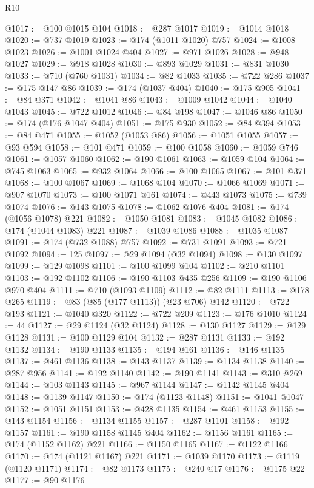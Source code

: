 \begin{lexlean}{R10}
\begin{coremodule}
@1017 := @100 @1015 @104
@1018 := @287 @1017
@1019 := @1014 @1018
@1020 := @737 @1019
@1023 := @174 (@1011 @1020) @757
@1024 := @1008 @1023
@1026 := @1001 @1024 @404
@1027 := @971 @1026
@1028 := @948 @1027
@1029 := @918 @1028
@1030 := @893 @1029
@1031 := @831 @1030
@1033 := @710 (@760 @1031)
@1034 := @82 @1033
@1035 := @722 @286
@1037 := @175 @147 @86
@1039 := @174 (@1037 @404)
@1040 := @175 @905
@1041 := @84 @371
@1042 := @1041 @86
@1043 := @1009 @1042
@1044 := @1040 @1043
@1045 := @722 @1012
@1046 := @84 @198
@1047 := @1046 @86
@1050 := @174 (@176 @1047 @404)
@1051 := @175 @930
@1052 := @84 @394
@1053 := @84 @471
@1055 := @1052 (@1053 @86)
@1056 := @1051 @1055
@1057 := @93 @594
@1058 := @101 @471
@1059 := @100 @1058
@1060 := @1059 @746
@1061 := @1057 @1060
@1062 := @190 @1061
@1063 := @1059 @104
@1064 := @745 @1063
@1065 := @932 @1064
@1066 := @100 @1065
@1067 := @101 @371
@1068 := @100 @1067
@1069 := @1068 @104
@1070 := @1066 @1069
@1071 := @907 @1070
@1073 := @100 @1071 @161
@1074 := @443 @1073
@1075 := @739 @1074
@1076 := @143 @1075
@1078 := @1062 @1076 @404
@1081 := @174 (@1056 @1078) @221
@1082 := @1050 @1081
@1083 := @1045 @1082
@1086 := @174 (@1044 @1083) @221
@1087 := @1039 @1086
@1088 := @1035 @1087
@1091 := @174 (@732 @1088) @757
@1092 := @731 @1091
@1093 := @721 @1092
@1094 := 125
@1097 := @29 @1094 (@32 @1094)
@1098 := @130 @1097
@1099 := @129 @1098
@1101 := @100 @1099 @104
@1102 := @210 @1101
@1103 := @192 @1102
@1106 := @190 @1103 @435 @256
@1109 := @190 @1106 @970 @404
@1111 := @710 (@1093 @1109)
@1112 := @82 @1111
@1113 := @178 @265
@1119 := @83 (@85 (@177 @1113)) (@23 @706) @142
@1120 := @722 @193
@1121 := @1040 @320
@1122 := @722 @209
@1123 := @176 @1010
@1124 := 44
@1127 := @29 @1124 (@32 @1124)
@1128 := @130 @1127
@1129 := @129 @1128
@1131 := @100 @1129 @104
@1132 := @287 @1131
@1133 := @192 @1132
@1134 := @190 @1133
@1135 := @194 @161
@1136 := @146 @1135
@1137 := @461 @1136
@1138 := @143 @1137
@1139 := @1134 @1138
@1140 := @287 @956
@1141 := @192 @1140
@1142 := @190 @1141
@1143 := @310 @269
@1144 := @103 @1143
@1145 := @967 @1144
@1147 := @1142 @1145 @404
@1148 := @1139 @1147
@1150 := @174 (@1123 @1148)
@1151 := @1041 @1047
@1152 := @1051 @1151
@1153 := @428 @1135
@1154 := @461 @1153
@1155 := @143 @1154
@1156 := @1134 @1155
@1157 := @287 @1101
@1158 := @192 @1157
@1161 := @190 @1158 @1145 @404
@1162 := @1156 @1161
@1165 := @174 (@1152 @1162) @221
@1166 := @1150 @1165
@1167 := @1122 @1166
@1170 := @174 (@1121 @1167) @221
@1171 := @1039 @1170
@1173 := @1119 (@1120 @1171)
@1174 := @82 @1173
@1175 := @240 @17
@1176 := @1175 @22
@1177 := @90 @1176

\end{coremodule}
\end{lexlean}
